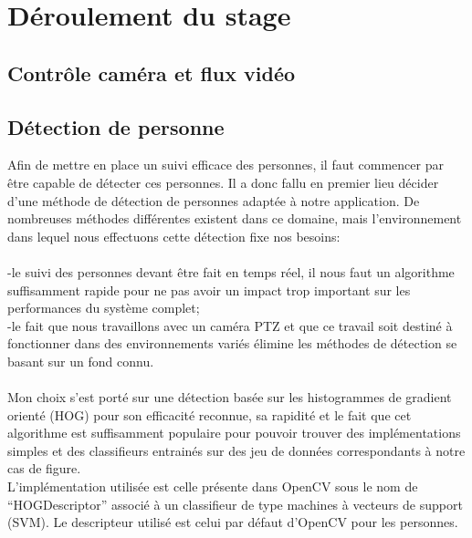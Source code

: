\documentclass[12pt]{article}
\begin{document}
\section{Déroulement du stage}
\subsection{Contrôle caméra et flux vidéo}
\pagebreak
\subsection{Détection de personne}
Afin de mettre en place un suivi efficace des personnes, il faut commencer par être capable de détecter ces personnes. Il a donc fallu en premier lieu décider d'une méthode de détection de personnes adaptée à notre application. De nombreuses méthodes différentes existent dans ce domaine, mais l'environnement dans lequel nous effectuons cette détection fixe nos besoins:\\
\\
-le suivi des personnes devant être fait en temps réel, il nous faut un algorithme suffisamment rapide pour ne pas avoir un impact trop important sur les performances du système complet;\\
-le fait que nous travaillons avec un caméra PTZ et que ce travail soit destiné à fonctionner dans des environnements variés élimine les méthodes de détection se basant sur un fond connu.\\
\\
Mon choix s'est porté sur une détection basée sur les histogrammes de gradient orienté (HOG) pour son efficacité reconnue, sa rapidité et le fait que cet algorithme est suffisamment populaire pour pouvoir trouver des implémentations simples et des classifieurs entrainés sur des jeu de données correspondants à notre cas de figure.\\
L’implémentation utilisée est celle présente dans OpenCV sous le nom de ``HOGDescriptor'' associé à un classifieur de type machines à vecteurs de support (SVM). Le descripteur utilisé est celui par défaut d'OpenCV pour les personnes.
\end{document}

